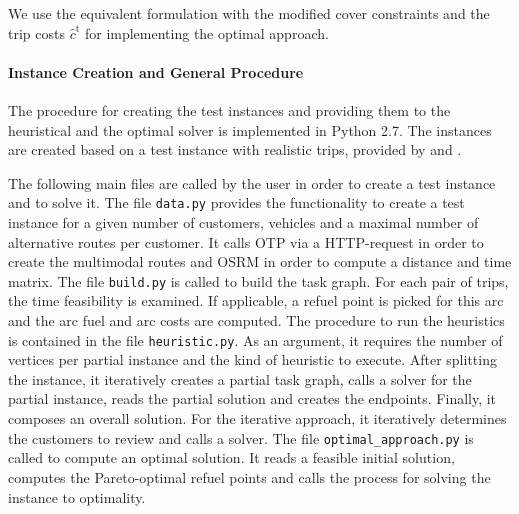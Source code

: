 We use the equivalent formulation with the modified cover constraints and the trip costs $\hat{c}^{\operatorname{t}}$ for implementing the optimal approach.

\paragraph{Instance Creation and General Procedure} \parfill

The procedure for creating the test instances and providing them to the heuristical and the optimal solver is implemented in Python 2.7. The instances are created based on a test instance with realistic trips, provided by \cite{Kaiser} and \cite{Knoll}.

The following main files are called by the user in order to create a test instance and to solve it. The file \texttt{data.py} provides the functionality to create a test instance for a given number of customers, vehicles and a maximal number of alternative routes per customer. It calls OTP via a HTTP-request in order to create the multimodal routes and OSRM in order to compute a distance and time matrix. The file \texttt{build.py} is called to build the task graph. For each pair of trips, the time feasibility is examined. If applicable, a refuel point is picked for this arc and the arc fuel and arc costs are computed. The procedure to run the heuristics is contained in the file \texttt{heuristic.py}. As an argument, it requires the number of vertices per partial instance and the kind of heuristic to execute. After splitting the instance, it iteratively creates a partial task graph, calls a solver for the partial instance, reads the partial solution and creates the endpoints. Finally, it composes an overall solution. For the iterative approach, it iteratively determines the customers to review and calls a solver. The file \texttt{optimal\_approach.py} is called to compute an optimal solution. It reads a feasible initial solution, computes the Pareto-optimal refuel points and calls the process for solving the instance to optimality.

